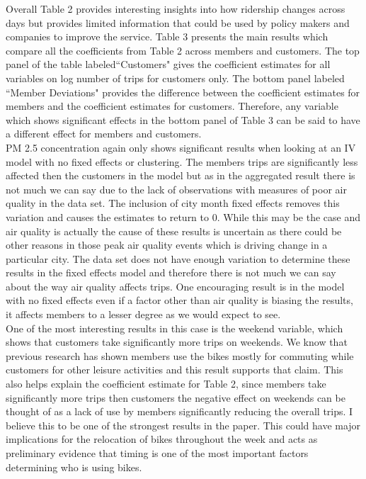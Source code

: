 \documentclass[12pt,letter paper]{article}
\begin{document}
Overall Table 2 provides interesting insights into how ridership changes across days but provides limited information that could be used by policy makers and companies to improve the service.  Table 3 presents the main results which compare all the coefficients from Table 2 across members and customers.  The top panel of the table labeled``Customers" gives the coefficient estimates for all variables on log number of trips for customers only.  The bottom panel labeled ``Member Deviations" provides the difference between the coefficient estimates for members and the coefficient estimates for customers.  Therefore, any variable which shows significant effects in the bottom panel of Table 3 can be said to have a different effect for members and customers.  \\

PM 2.5 concentration again only shows significant results when looking at an IV model with no fixed effects or clustering.  The members trips are significantly less affected then the customers in the model but as in the aggregated result there is not much we can say due to the lack of observations with measures of poor air quality in the data set.  The inclusion of city month fixed effects removes this variation and causes the estimates to return to 0.  While this may be the case and air quality is actually the cause of these results is uncertain as there could be other reasons in those peak air quality events which is driving change in a particular city.  The data set does not have enough variation to determine these results in the fixed effects model and therefore there is not much we can say about the way air quality affects trips.  One encouraging result is in the model with no fixed effects even if a factor other than air quality is biasing the results, it affects members to a lesser degree as we would expect to see.   \\


One of the most interesting results in this case is the weekend variable, which shows that customers take significantly more trips on weekends.  We know that previous research has shown members use the bikes mostly for commuting while customers for other leisure activities and this result supports that claim.  This also helps explain the coefficient estimate for Table 2, since members take significantly more trips then customers the negative effect on weekends can be thought of as a lack of use by members significantly reducing the overall trips.  I believe this to be one of the strongest results in the paper.  This could have major implications for the relocation of bikes throughout the week and acts as preliminary evidence that timing is one of the most important factors determining who is using bikes. \\
\end{document}
